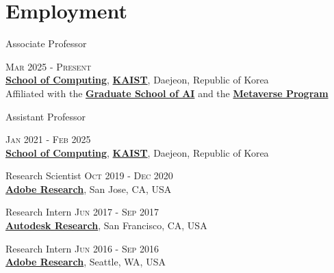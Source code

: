 \documentclass[letterpaper,10pt]{article} %
\begin{document}

\section{Employment}

Associate Professor \hfill{\textsc{Mar 2025 - Present}\\
\href{http://cs.kaist.ac.kr/}{\textbf{School of Computing}}, \href{http://www.kaist.ac.kr/}{\textbf{KAIST}}, Daejeon, Republic of Korea\\
Affiliated with the \href{https://gsai.kaist.ac.kr/}{\textbf{Graduate School of AI}} and the \href{https://meta.kaist.ac.kr/}{\textbf{Metaverse Program}}


Assistant Professor \hfill{\textsc{Jan 2021 - Feb 2025}\\
\href{http://cs.kaist.ac.kr/}{\textbf{School of Computing}}, \href{http://www.kaist.ac.kr/}{\textbf{KAIST}}, Daejeon, Republic of Korea


Research Scientist \hfill{\textsc{Oct 2019 - Dec 2020}}\\
\href{https://research.adobe.com}{\textbf{Adobe Research}}, San Jose, CA, USA 


Research Intern \hfill{\textsc{Jun 2017 - Sep 2017}}\\
\href{https://www.autodeskresearch.com}{\textbf{Autodesk Research}}, San Francisco, CA, USA


Research Intern \hfill{\textsc{Jun 2016 - Sep 2016}}\\
\href{https://research.adobe.com/}{\textbf{Adobe Research}}, Seattle, WA, USA

}}
\end{document}
